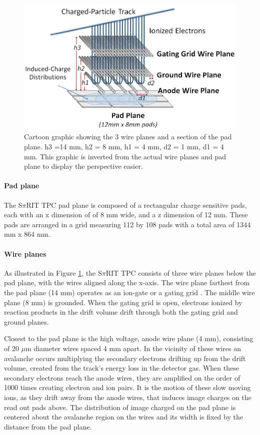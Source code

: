 \documentclass[review]{elsarticle}
\begin{document}
\begin{figure}[H]
\includegraphics[width=\linewidth]{padwire}
\caption{Cartoon graphic showing the 3 wire planes and a section of the pad plane. h3 =14 mm, h2 = 8 mm, h1 = 4 mm, d2 = 1 mm, d1 = 4 mm. This graphic is inverted from the actual wire planes and pad plane to display the perspective easier.}
\label{fig:padwire}
\end{figure}

\paragraph{Pad plane} 
The S$\pi$RIT TPC pad plane is composed of a rectangular charge sensitive pads, each with an x dimension of of 8 mm wide, and a z dimension of 12 mm. These pads are arranged in a grid measuring 112 by 108 pads with a total area of 1344 mm x 864 mm.

\paragraph{Wire planes}
As illustrated in Figure \ref{fig:padwire}, the S$\pi$RIT TPC consists of three wire planes below the pad plane, with the wires aligned along the x-axis. The wire plane farthest from the pad plane (14 mm) operates as an ion-gate or a gating grid \cite{suwat}. The middle wire plane (8 mm) is grounded. When the gating grid is open, electrons ionized by reaction products in the drift volume drift through both the gating grid and ground planes. 

Closest to the pad plane is the high voltage, anode wire plane (4 mm), consisting of 20 $\mu$m diameter wires spaced 4 mm apart. In the vicinity of these wires an avalanche occurs multiplying the secondary electrons drifting up from the drift volume, created from the track's energy loss in the detector gas. When these secondary electrons reach the anode wires, they are amplified on the order of 1000 times creating electron and ion pairs. It is the motion of these slow moving ions, as they drift away from the anode wires, that induces image charges on the read out pads above. The distribution of image charged on the pad plane is centered about the avalanche region on the wires and its width is fixed by the distance from the pad plane. 
\end{document}
